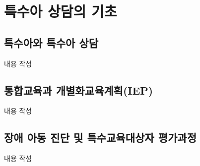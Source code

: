 \section{특수아 상담의 기초}

\subsection{특수아와 특수아 상담}
내용 작성

\subsection{통합교육과 개별화교육계획(IEP)}
내용 작성

\subsection{장애 아동 진단 및 특수교육대상자 평가과정}
내용 작성
